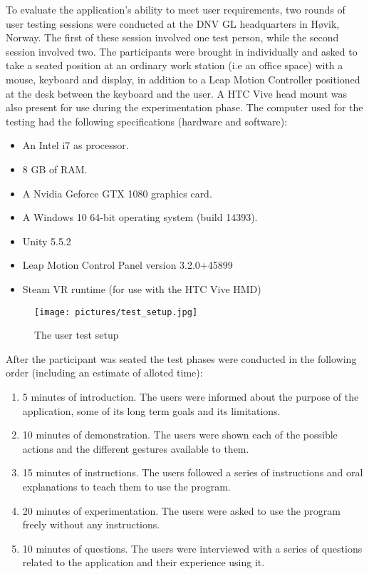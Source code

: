 
To evaluate the application's ability to meet user requirements, two rounds of user testing sessions were conducted at the DNV GL headquarters in Høvik, Norway.
The first of these session involved one test person, while the second session involved two. 
The participants were brought in individually and asked to take a seated position at an ordinary work station (i.e an office space) with a mouse, keyboard and display, 
in addition to a Leap Motion Controller positioned at the desk between the keyboard and the user. A HTC Vive head mount was also present for use during the experimentation phase. 
The computer used for the testing had the following specifications (hardware and software):

\begin{itemize}
    \item An Intel i7 as processor.
    \item 8 GB of RAM.
    \item A Nvidia Geforce GTX 1080 graphics card.
    \item A Windows 10 64-bit operating system (build 14393).
    \item Unity 5.5.2
    \item Leap Motion Control Panel version 3.2.0+45899
    \item Steam VR runtime (for use with the HTC Vive HMD)
\end{itemize}

\begin{figure}%
	\texttt{[image: pictures/test\_setup.jpg]}
	\caption[The user test setup]{The user test setup}
	\label{fig:test_setup}
\end{figure} 

After the participant was seated the test phases were conducted in the following order (including an estimate of alloted time):

\begin{enumerate}
    \item  5 minutes of introduction. The users were informed about the purpose of the application, some of its long term goals and its limitations.
    \item 10 minutes of demonstration. The users were shown each of the possible actions and the different gestures available to them.
    \item 15 minutes of instructions. The users followed a series of instructions and oral explanations to teach them to use the program.
    \item 20 minutes of experimentation. The users were asked to use the program freely without any instructions.  
    \item 10 minutes of questions. The users were interviewed with a series of questions related to the application and their experience using it.   
\end{enumerate}

